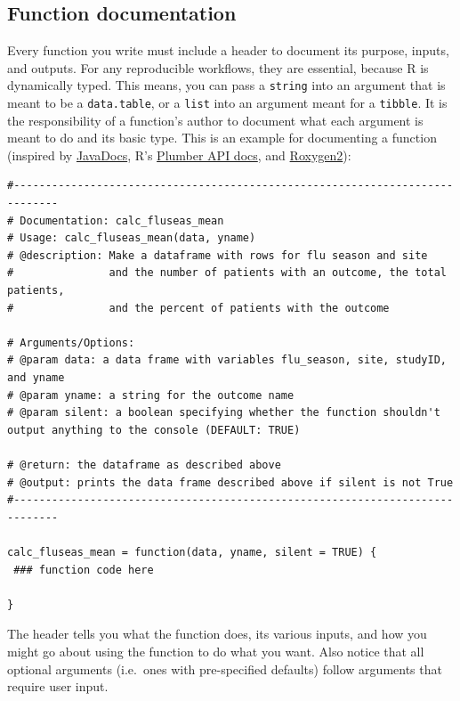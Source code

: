 \documentclass[]{book}
\begin{document}
\hypertarget{function-documentation}{%
\subsection{Function documentation}\label{function-documentation}}

Every function you write must include a header to document its purpose, inputs, and outputs. For any reproducible workflows, they are essential, because R is dynamically typed. This means, you can pass a \texttt{string} into an argument that is meant to be a \texttt{data.table}, or a \texttt{list} into an argument meant for a \texttt{tibble}. It is the responsibility of a function's author to document what each argument is meant to do and its basic type. This is an example for documenting a function (inspired by \href{https://www.oracle.com/technetwork/java/javase/documentation/index-137868.html\#format}{JavaDocs}, R's \href{https://blog.rstudio.com/2018/10/23/rstudio-1-2-preview-plumber-integration/}{Plumber API docs}, and \href{https://kbroman.org/pkg_primer/pages/docs.html}{Roxygen2}):

\begin{verbatim}
#-----------------------------------------------------------------------------
# Documentation: calc_fluseas_mean
# Usage: calc_fluseas_mean(data, yname)
# @description: Make a dataframe with rows for flu season and site
#               and the number of patients with an outcome, the total patients,
#               and the percent of patients with the outcome

# Arguments/Options:
# @param data: a data frame with variables flu_season, site, studyID, and yname
# @param yname: a string for the outcome name
# @param silent: a boolean specifying whether the function shouldn't output anything to the console (DEFAULT: TRUE)

# @return: the dataframe as described above
# @output: prints the data frame described above if silent is not True
#-----------------------------------------------------------------------------

calc_fluseas_mean = function(data, yname, silent = TRUE) {
 ### function code here 

}
\end{verbatim}

The header tells you what the function does, its various inputs, and how you might go about using the function to do what you want. Also notice that all optional arguments (i.e.~ones with pre-specified defaults) follow arguments that require user input.
\end{document}
